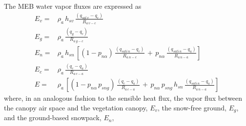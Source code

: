 
The MEB water vapor fluxes 
are expressed as
%
\begin{align}
\label{eq:meb_evap_veg}
E_{v} =& \rho_a \, h_{sv} \,
{\frac{\left( q_{sat\,v} - q_c \right)}{R_{a\,v-c}}}
\\
%
\label{eq:meb_evap_grnd}
E_{g} =& 
\rho_a \, 
{\frac{\left(q_g - q_c \right)}{R_{a\,g-c}}}
\\
%
\label{eq:meb_evap_snow}
E_{n}=& 
\rho_a \, h_{sn}\,
\left[
\left(1-p_{n\alpha}\right)\,
{\frac{\left( q_{sati\,n}- q_c \right)}{R_{a\,n-c}}}
\,+\,
p_{n\alpha}\,
{\frac{\left( q_{sati\,n} - q_a \right)}{R_{a\,n-a}}}
\right]
%
%
\\
%
\label{eq:meb_evap_ca}
E_{c} =& 
\rho_a \,{\frac{\left( q_c - q_a \right)}{R_{a\,c-a}}} 
%
\\
%
\label{eq:meb_evap_all}
E =& 
\rho_a \, 
\left[
\left(1-p_{n\alpha}\, p_{sng}\right)\, 
{\frac{\left( q_c - q_a \right)}{R_{a\,c-a}}} 
\,+\,
p_{n\alpha}\, p_{sng}\, 
h_{sn}\,
{\frac{\left( q_{sati\,n} - q_a \right)}{R_{a\,n-a}}}
\right]
%
%
%
%
\end{align}
%
where, in an analogous fashion to the sensible heat flux, 
the vapor
flux between the canopy air space and the vegetation canopy, $E_v$, 
the snow-free ground, $E_g$, and the ground-based snowpack, $E_n$,
